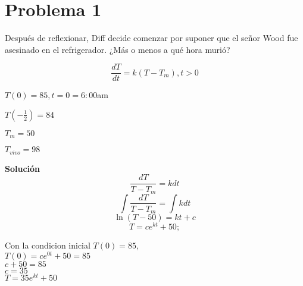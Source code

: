 \section*{Problema 1}
Después de reflexionar, Diff decide comenzar por suponer que el señor Wood fue asesinado en el refrigerador. 
¿Más o menos a qué hora murió?

\begin{equation}
    \frac{dT}{dt} = k(T - T_m), t > 0
\end{equation}
\begin{center}
$T(0) = 85, t = 0 = 6:00$am\\
\vspace{8pt}

$T(-\frac{1}{2}) = 84$\\
\vspace{8pt}

$T_m = 50$\\
\vspace{8pt}

$T_{vivo} = 98$\\ 
\vspace{12pt}


\textbf{Solución}\\ 
\begin{equation*}
\frac{dT}{T - T_m} = kdt
\end{equation*}
\vspace{2pt}
\begin{equation*}
\int{\frac{dT}{T - T_m}} = \int{kdt}
\end{equation*}
\vspace{2pt}
\begin{equation*}
\ln{(T - 50)} = kt + c
\end{equation*}
\vspace{2pt}
\begin{equation*}
T = ce^{kt} + 50;
\end{equation*}
\vspace{2pt}

Con la condicion inicial $T(0) = 85$,\\
\vspace{8pt}
$T(0) = ce^{0t} + 50 = 85$\\
\vspace{8pt}
$c + 50 = 85$\\
\vspace{8pt}
$c = 35$\\
\vspace{8pt}
$T = 35e^{kt} + 50$\\
\vspace{12pt}


\end{center}
